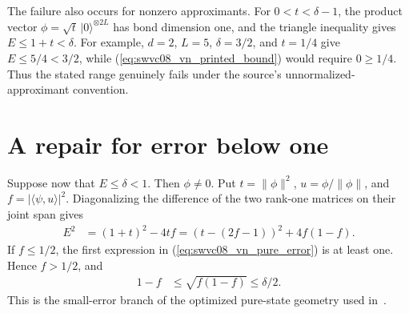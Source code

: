 \documentclass{article}
\begin{document}
The failure also occurs for nonzero approximants. For $0<t<\delta-1$,
the product vector $\phi=\sqrt t\,|0\rangle^{\otimes 2L}$ has bond dimension
one, and the triangle inequality gives
$E\le1+t<\delta$. For example, $d=2$, $L=5$, $\delta=3/2$, and $t=1/4$
give $E\le5/4<3/2$, while (\ref{eq:swvc08_vn_printed_bound}) would require
$0\ge1/4$. Thus the stated range genuinely fails under the source's
unnormalized-approximant convention.

\newpage
\section{A repair for error below one}

Suppose now that $E\le\delta<1$. Then $\phi\ne0$. Put
$t=\lVert\phi\rVert^2$, $u=\phi/\lVert\phi\rVert$, and
$f=|\langle\psi,u\rangle|^2$. Diagonalizing the difference of the two
rank-one matrices on their joint span gives
\begin{align}
    E^2 & =(1+t)^2-4tf=(t-(2f-1))^2+4f(1-f).
    \label{eq:swvc08_vn_pure_error}
\end{align}
If $f\le1/2$, the first expression in
(\ref{eq:swvc08_vn_pure_error}) is at least one. Hence $f>1/2$, and
\begin{align}
    1-f & \le\sqrt{f(1-f)}\le\delta/2.
    \label{eq:swvc08_vn_lost_overlap}
\end{align}
This is the small-error branch of the optimized pure-state geometry
used in~\cite{Schuch2008EntropyScaling}.
\end{document}
